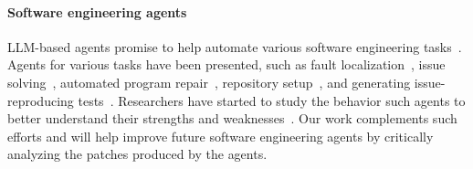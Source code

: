 \paragraph{Software engineering agents}
LLM-based agents promise to help automate various software engineering tasks~\cite{AgenticAISE2025}.
Agents for various tasks have been presented, such as fault localization~\cite{kang2024evaluating,xu2025flexfl,jiang2025cosil}, issue solving~\cite{Yang2024a,zhang2024autocoderover,xia2024agentless}, automated program repair~\cite{icse2025-RepairAgent,Cheng2025}, repository setup~\cite{issta2025_ExecutionAgent,Eliseeva2025,Milliken2025}, and generating issue-reproducing tests~\cite{Muendler2024,Issue2Test_arXiv2025}.
Researchers have started to study the behavior such agents to better understand their strengths and weaknesses~\cite{ase2025_agent_study}.
Our work complements such efforts and will help improve future software engineering agents by critically analyzing the patches produced by the agents.
